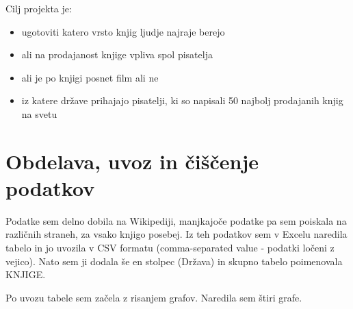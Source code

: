 \documentclass[11pt,a4paper]{article}
\begin{document}
\null
Cilj projekta je:
\begin{itemize}
\item ugotoviti katero vrsto knjig ljudje najraje berejo
\item ali na prodajanost knjige vpliva spol pisatelja
\item ali je po knjigi posnet film ali ne
\item iz katere države prihajajo pisatelji, ki so napisali 50 najbolj    prodajanih knjig na svetu 
\end{itemize}


\pagebreak

\section{Obdelava, uvoz in čiščenje podatkov}

Podatke sem delno dobila na Wikipediji, manjkajoče podatke pa sem poiskala na različnih straneh, za vsako knjigo posebej. Iz teh podatkov sem v Excelu naredila tabelo in jo uvozila v CSV formatu (comma-separated value - podatki ločeni z vejico). Nato sem ji dodala še en stolpec (Država) in skupno tabelo poimenovala KNJIGE. 

Po uvozu tabele sem začela z risanjem grafov. Naredila sem štiri grafe.
\end{document}
